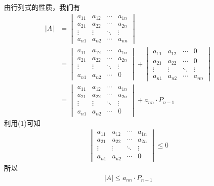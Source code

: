 \documentclass{article}
\begin{document}
\begin{itemize}
        由行列式的性质，我们有
        \begin{align*}
          |A| & = \begin{vmatrix}
                    a_{11} & a_{12} & \cdots & a_{1n} \\
                    a_{21} & a_{22} & \cdots & a_{2n} \\
                    \vdots & \vdots & \ddots & \vdots \\
                    a_{n1} & a_{n2} & \cdots & a_{nn}
                  \end{vmatrix}                 \\
              & = \begin{vmatrix}
                    a_{11} & a_{12} & \cdots & a_{1n} \\
                    a_{21} & a_{22} & \cdots & a_{2n} \\
                    \vdots & \vdots & \ddots & \vdots \\
                    a_{n1} & a_{n2} & \cdots & 0
                  \end{vmatrix} + \begin{vmatrix}
                                    a_{11} & a_{12} & \cdots & 0      \\
                                    a_{21} & a_{22} & \cdots & 0      \\
                                    \vdots & \vdots & \ddots & \vdots \\
                                    a_{n1} & a_{n2} & \cdots & a_{nn}
                                  \end{vmatrix} \\
              & = \begin{vmatrix}
                    a_{11} & a_{12} & \cdots & a_{1n} \\
                    a_{21} & a_{22} & \cdots & a_{2n} \\
                    \vdots & \vdots & \ddots & \vdots \\
                    a_{n1} & a_{n2} & \cdots & 0
                  \end{vmatrix}
          + a_{nn} \cdot P_{n - 1}
        \end{align*}
        利用(1)可知
        \begin{align*}
          \begin{vmatrix}
            a_{11} & a_{12} & \cdots & a_{1n} \\
            a_{21} & a_{22} & \cdots & a_{2n} \\
            \vdots & \vdots & \ddots & \vdots \\
            a_{n1} & a_{n2} & \cdots & 0
          \end{vmatrix} \leq 0
        \end{align*}
        所以
        \begin{align*}
          |A| \leq a_{nn} \cdot P_{n - 1}
        \end{align*}


\end{itemize}
\end{document}
